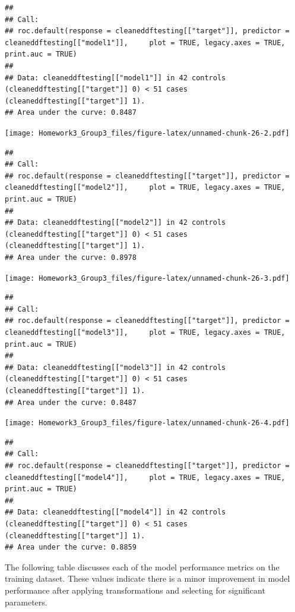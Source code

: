 \documentclass[
]{article}
\begin{document}
\begin{verbatim}
## 
## Call:
## roc.default(response = cleaneddftesting[["target"]], predictor = cleaneddftesting[["model1"]],     plot = TRUE, legacy.axes = TRUE, print.auc = TRUE)
## 
## Data: cleaneddftesting[["model1"]] in 42 controls (cleaneddftesting[["target"]] 0) < 51 cases (cleaneddftesting[["target"]] 1).
## Area under the curve: 0.8487
\end{verbatim}

\texttt{[image: Homework3\_Group3\_files/figure-latex/unnamed-chunk-26-2.pdf]}

\begin{verbatim}
## 
## Call:
## roc.default(response = cleaneddftesting[["target"]], predictor = cleaneddftesting[["model2"]],     plot = TRUE, legacy.axes = TRUE, print.auc = TRUE)
## 
## Data: cleaneddftesting[["model2"]] in 42 controls (cleaneddftesting[["target"]] 0) < 51 cases (cleaneddftesting[["target"]] 1).
## Area under the curve: 0.8978
\end{verbatim}

\texttt{[image: Homework3\_Group3\_files/figure-latex/unnamed-chunk-26-3.pdf]}

\begin{verbatim}
## 
## Call:
## roc.default(response = cleaneddftesting[["target"]], predictor = cleaneddftesting[["model3"]],     plot = TRUE, legacy.axes = TRUE, print.auc = TRUE)
## 
## Data: cleaneddftesting[["model3"]] in 42 controls (cleaneddftesting[["target"]] 0) < 51 cases (cleaneddftesting[["target"]] 1).
## Area under the curve: 0.8487
\end{verbatim}

\texttt{[image: Homework3\_Group3\_files/figure-latex/unnamed-chunk-26-4.pdf]}

\begin{verbatim}
## 
## Call:
## roc.default(response = cleaneddftesting[["target"]], predictor = cleaneddftesting[["model4"]],     plot = TRUE, legacy.axes = TRUE, print.auc = TRUE)
## 
## Data: cleaneddftesting[["model4"]] in 42 controls (cleaneddftesting[["target"]] 0) < 51 cases (cleaneddftesting[["target"]] 1).
## Area under the curve: 0.8859
\end{verbatim}

The following table discusses each of the model performance metrics on
the training dataset. These values indicate there is a minor improvement
in model performance after applying transformations and selecting for
significant parameters.
\end{document}
